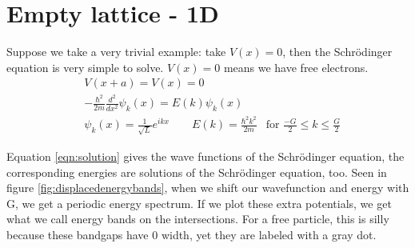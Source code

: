 \section{Empty lattice - 1D}
Suppose we take a very trivial example: take $V(x) = 0$, then the Schrödinger equation is very simple to solve. $V(x) = 0$ means we have free electrons.
\begin{align}
    &V(x+a) = V(x) = 0\\
    &-\frac{\hbar^2}{2m}\frac{d^2}{dx^2}\psi_k(x) = E(k)\psi_k(x)\\
    &\psi_k(x) = \frac{1}{\sqrt{L}}e^{ikx} \qquad E(k) = \frac{\hbar^2k^2}{2m} & \text{for }\frac{-G}{2} \leq k \leq \frac{G}{2}\label{eqn:solution}
\end{align}

Equation \ref{eqn:solution} gives the wave functions of the Schrödinger equation, the corresponding energies are solutions of the Schrödinger equation, too. Seen in figure \ref{fig:displacedenergybands}, when we shift our wavefunction and energy with G, we get a periodic energy spectrum. If we plot these extra potentials, we get what we call energy bands on the intersections. For a free particle, this is silly because these bandgaps have $0$ width, yet they are labeled with a gray dot.

